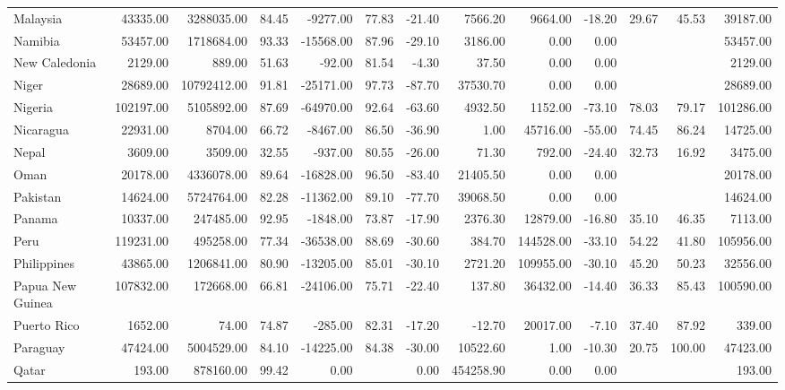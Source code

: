 \begin{table}[ht]
\begin{tabular}{lrrrrrrrrrrrr}
  Malaysia & 43335.00 & 3288035.00 & 84.45 & -9277.00 & 77.83 & -21.40 & 7566.20 & 9664.00 & -18.20 & 29.67 & 45.53 & 39187.00 \\ 
  Namibia & 53457.00 & 1718684.00 & 93.33 & -15568.00 & 87.96 & -29.10 & 3186.00 & 0.00 & 0.00 &  &  & 53457.00 \\ 
  New Caledonia & 2129.00 & 889.00 & 51.63 & -92.00 & 81.54 & -4.30 & 37.50 & 0.00 & 0.00 &  &  & 2129.00 \\ 
  Niger & 28689.00 & 10792412.00 & 91.81 & -25171.00 & 97.73 & -87.70 & 37530.70 & 0.00 & 0.00 &  &  & 28689.00 \\ 
  Nigeria & 102197.00 & 5105892.00 & 87.69 & -64970.00 & 92.64 & -63.60 & 4932.50 & 1152.00 & -73.10 & 78.03 & 79.17 & 101286.00 \\ 
  Nicaragua & 22931.00 & 8704.00 & 66.72 & -8467.00 & 86.50 & -36.90 & 1.00 & 45716.00 & -55.00 & 74.45 & 86.24 & 14725.00 \\ 
  Nepal & 3609.00 & 3509.00 & 32.55 & -937.00 & 80.55 & -26.00 & 71.30 & 792.00 & -24.40 & 32.73 & 16.92 & 3475.00 \\ 
  Oman & 20178.00 & 4336078.00 & 89.64 & -16828.00 & 96.50 & -83.40 & 21405.50 & 0.00 & 0.00 &  &  & 20178.00 \\ 
  Pakistan & 14624.00 & 5724764.00 & 82.28 & -11362.00 & 89.10 & -77.70 & 39068.50 & 0.00 & 0.00 &  &  & 14624.00 \\ 
  Panama & 10337.00 & 247485.00 & 92.95 & -1848.00 & 73.87 & -17.90 & 2376.30 & 12879.00 & -16.80 & 35.10 & 46.35 & 7113.00 \\ 
  Peru & 119231.00 & 495258.00 & 77.34 & -36538.00 & 88.69 & -30.60 & 384.70 & 144528.00 & -33.10 & 54.22 & 41.80 & 105956.00 \\ 
  Philippines & 43865.00 & 1206841.00 & 80.90 & -13205.00 & 85.01 & -30.10 & 2721.20 & 109955.00 & -30.10 & 45.20 & 50.23 & 32556.00 \\ 
  Papua New Guinea & 107832.00 & 172668.00 & 66.81 & -24106.00 & 75.71 & -22.40 & 137.80 & 36432.00 & -14.40 & 36.33 & 85.43 & 100590.00 \\ 
  Puerto Rico & 1652.00 & 74.00 & 74.87 & -285.00 & 82.31 & -17.20 & -12.70 & 20017.00 & -7.10 & 37.40 & 87.92 & 339.00 \\ 
  Paraguay & 47424.00 & 5004529.00 & 84.10 & -14225.00 & 84.38 & -30.00 & 10522.60 & 1.00 & -10.30 & 20.75 & 100.00 & 47423.00 \\ 
  Qatar & 193.00 & 878160.00 & 99.42 & 0.00 &  & 0.00 & 454258.90 & 0.00 & 0.00 &  &  & 193.00 \\ 

\end{tabular}
\end{table}
